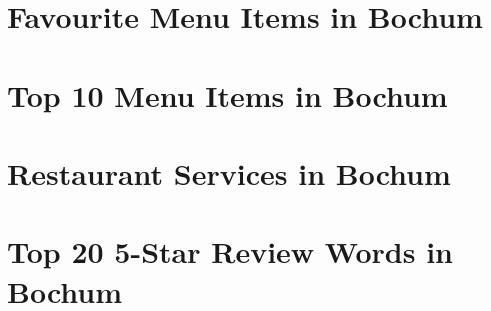 \begin{appendices}
\section{Favourite Menu Items in Bochum}
\label{app:fav_items}

\section{Top 10 Menu Items in Bochum}
\label{app:items}

\section{Restaurant Services in Bochum}
\label{app:services}

\section{Top 20 5-Star Review Words in Bochum}
\label{app:review}

\end{appendices}
